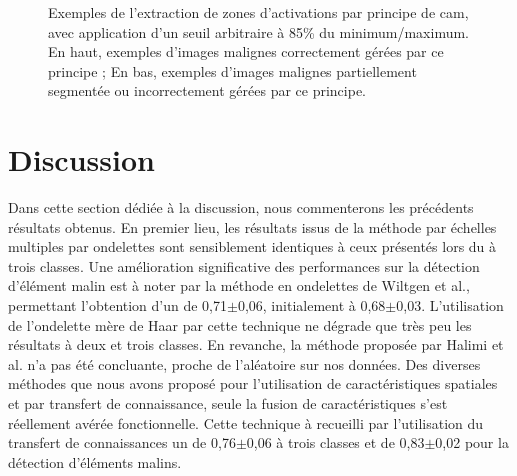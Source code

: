\begin{figure}[H]
    \caption{Exemples de l'extraction de zones d'activations par principe de \gls{cam}, avec application d'un seuil arbitraire à 85\% du minimum/maximum. En haut, exemples d'images malignes correctement gérées par ce principe ; En bas, exemples d'images malignes partiellement segmentée ou incorrectement gérées par ce principe.}
    \label{fig:example_image_improvement_ft}
\end{figure}\par
\clearpage

\section{Discussion}
Dans cette section dédiée à la discussion, nous commenterons les précédents résultats obtenus. En premier lieu, les résultats issus de la méthode par échelles multiples par ondelettes sont sensiblement identiques à ceux présentés lors du  à trois classes. Une amélioration significative des performances sur la détection d'élément malin est à noter par la méthode en ondelettes de Wiltgen et al., permettant l'obtention d'un \fscore{} de 0,71$\pm$0,06, initialement à 0,68$\pm$0,03. L'utilisation de l'ondelette mère de Haar par cette technique ne dégrade que très peu les résultats à deux et trois classes. En revanche, la méthode proposée par Halimi et al. n'a pas été concluante, proche de l'aléatoire sur nos données. Des diverses méthodes que nous avons proposé pour l'utilisation de caractéristiques spatiales et par transfert de connaissance, seule la fusion de caractéristiques s'est réellement avérée fonctionnelle. Cette technique à recueilli par l'utilisation du transfert de connaissances un \fscore{} de 0,76$\pm$0,06 à trois classes et de 0,83$\pm$0,02 pour la détection d'éléments malins.\par

